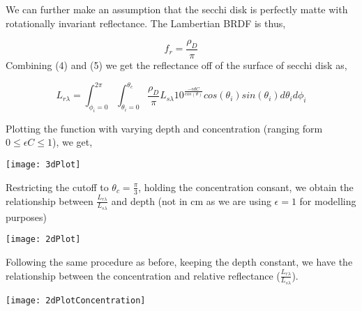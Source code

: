 \documentclass{article}
\begin{document}
We can further make an assumption that the secchi disk is perfectly matte with rotationally
invariant reflectance. The Lambertian BRDF is thus,

\begin{equation}
  f_r = \frac{\rho_D}{\pi}
\end{equation}
Combining (4) and (5) we get the reflectance off of the surface of secchi disk as,

\begin{equation}
  L_{r \lambda} = \int^{2\pi}_{\phi_i = 0}\int^{\theta_c}_{\theta_i = 0}
  \frac{\rho_D}{\pi} L_{s\lambda} 10^\frac{-\epsilon d C}{cos(\theta)}cos(\theta_i)sin(\theta_i)d\theta_i d\phi_i
\end{equation}

Plotting the function with varying depth and concentration (ranging form $0 \leq \epsilon C \leq1$), we get,

\begin{center}
    \texttt{[image: 3dPlot]}
\end{center}
Restricting the cutoff to $ \theta_c = \frac{\pi}{3}$, holding the concentration consant,
we obtain the relationship between $ \frac{L_{r\lambda}}{L_{s\lambda}}$ and depth (not in cm as we are using
$ \epsilon =1$ for modelling purposes)
\begin{center}
    \texttt{[image: 2dPlot]}
\end{center}
Following the same procedure as before, keeping the depth constant, we have the relationship between the
concentration and relative reflectance ($ \frac{L_{r\lambda}}{L_{s\lambda}}$).
\begin{center}
  \texttt{[image: 2dPlotConcentration]}
\end{center}
\end{document}
